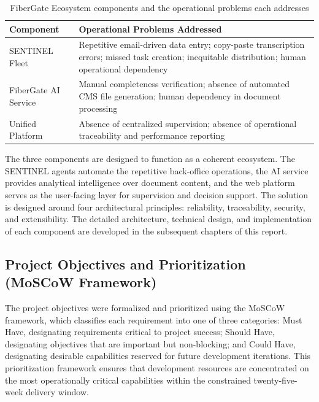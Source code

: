 \begin{table}[H]
  \centering
  \caption{FiberGate Ecosystem components and the operational problems each addresses}
  \renewcommand{\arraystretch}{1.0}
  \begin{tabularx}{\textwidth}{|X|X|}
    \hline
    \textbf{Component} & \textbf{Operational Problems Addressed} \\ \hline
    SENTINEL Fleet & Repetitive email-driven data entry; copy-paste transcription errors; missed task creation; inequitable distribution; human operational dependency \\ \hline
    FiberGate AI Service & Manual completeness verification; absence of automated CMS file generation; human dependency in document processing \\ \hline
    Unified Platform & Absence of centralized supervision; absence of operational traceability and performance reporting \\ \hline
  \end{tabularx}
\end{table}

The three components are designed to function as a coherent ecosystem. The SENTINEL agents automate the repetitive back-office operations, the AI service provides analytical intelligence over document content, and the web platform serves as the user-facing layer for supervision and decision support. The solution is designed around four architectural principles: reliability, traceability, security, and extensibility. The detailed architecture, technical design, and implementation of each component are developed in the subsequent chapters of this report.

\subsection{Project Objectives and Prioritization (MoSCoW Framework)}

The project objectives were formalized and prioritized using the MoSCoW framework, which classifies each requirement into one of three categories: Must Have, designating requirements critical to project success; Should Have, designating objectives that are important but non-blocking; and Could Have, designating desirable capabilities reserved for future development iterations. This prioritization framework ensures that development resources are concentrated on the most operationally critical capabilities within the constrained twenty-five-week delivery window.

